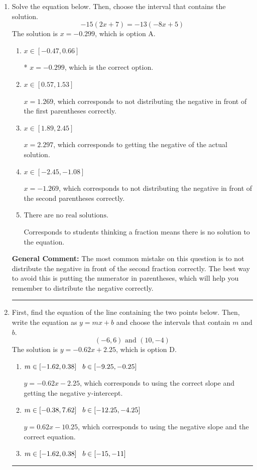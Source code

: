 \documentclass{extbook}[14pt]
\newcommand{\litem}[1]{\item #1

\rule{\textwidth}{0.4pt}}
\begin{document}
\begin{enumerate}\litem{
Solve the equation below. Then, choose the interval that contains the solution.
\[ -15(2x + 7) = -13(-8x + 5) \]
The solution is \( x = -0.299 \), which is option A.\begin{enumerate}[label=\Alph*.]
\item \( x \in [-0.47, 0.66] \)

* $x = -0.299$, which is the correct option.
\item \( x \in [0.57, 1.53] \)

$x = 1.269$, which corresponds to not distributing the negative in front of the first parentheses correctly.
\item \( x \in [1.89, 2.45] \)

$x = 2.297$, which corresponds to getting the negative of the actual solution.
\item \( x \in [-2.45, -1.08] \)

$x = -1.269$, which corresponds to not distributing the negative in front of the second parentheses correctly.
\item \( \text{There are no real solutions.} \)

Corresponds to students thinking a fraction means there is no solution to the equation.
\end{enumerate}

\textbf{General Comment:} The most common mistake on this question is to not distribute the negative in front of the second fraction correctly. The best way to avoid this is putting the numerator in parentheses, which will help you remember to distribute the negative correctly.
}
\litem{
First, find the equation of the line containing the two points below. Then, write the equation as $ y=mx+b $ and choose the intervals that contain $m$ and $b$.
\[ (-6, 6) \text{ and } (10, -4) \]
The solution is \( y = -0.62x + 2.25 \), which is option D.\begin{enumerate}[label=\Alph*.]
\item \( m \in [-1.62, 0.38] \hspace*{3mm} b \in [-9.25, -0.25] \)

 $y = -0.62x -2.25$, which corresponds to using the correct slope and getting the negative y-intercept.
\item \( m \in [-0.38, 7.62] \hspace*{3mm} b \in [-12.25, -4.25] \)

 $y = 0.62x -10.25$, which corresponds to using the negative slope and the correct equation.
\item \( m \in [-1.62, 0.38] \hspace*{3mm} b \in [-15, -11] \)


\end{enumerate}}
\end{enumerate}
\end{document}

